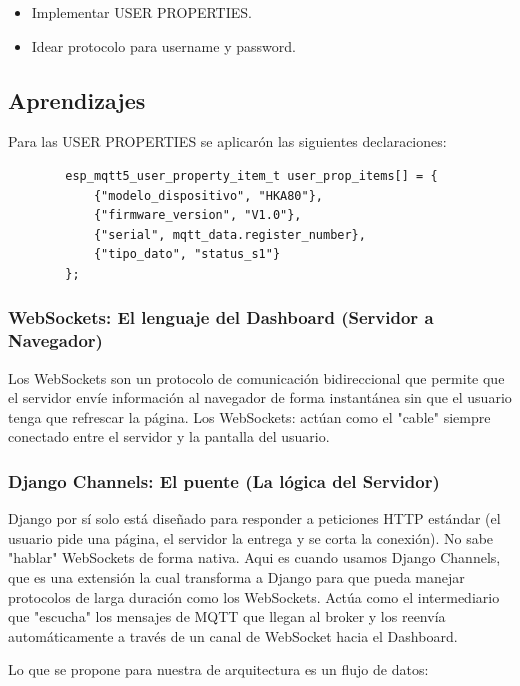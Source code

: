 \documentclass[12pt, a4paper]{article}
\begin{document}
    \begin{itemize}
        \item Implementar USER PROPERTIES.
        \item Idear protocolo para username y password.
    \end{itemize}

    \subsection*{Aprendizajes}

    Para las USER PROPERTIES se aplicarón las siguientes declaraciones:

    \begin{verbatim}
        esp_mqtt5_user_property_item_t user_prop_items[] = {
            {"modelo_dispositivo", "HKA80"},
            {"firmware_version", "V1.0"},
            {"serial", mqtt_data.register_number},
            {"tipo_dato", "status_s1"}
        };
    \end{verbatim}

    {\color{red} \subsubsection*{WebSockets: El lenguaje del Dashboard (Servidor a Navegador)}}
    
    Los WebSockets son un protocolo de comunicación bidireccional que permite que el servidor envíe información al navegador de forma instantánea sin que el usuario tenga que refrescar la página. Los WebSockets: actúan como el "cable" siempre conectado entre el servidor y la pantalla del usuario.

    {\color{red} \subsubsection*{Django Channels: El puente (La lógica del Servidor)}}
    
    Django por sí solo está diseñado para responder a peticiones HTTP estándar (el usuario pide una página, el servidor la entrega y se corta la conexión). No sabe "hablar" WebSockets de forma nativa. Aqui es cuando usamos Django Channels, que es una extensión la cual transforma a Django para que pueda manejar protocolos de larga duración como los WebSockets. Actúa como el intermediario que "escucha" los mensajes de MQTT que llegan al broker y los reenvía automáticamente a través de un canal de WebSocket hacia el Dashboard.

     Lo que se propone para nuestra de arquitectura es un flujo de datos:
\end{document}
